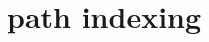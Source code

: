 \documentclass[ 
xcolor={usenames,dvipsnames,svgnames,tablem} 
,handout
]{beamer}
\begin{document}

\begin{frame}
\begin{definition}

\end{definition}
\end{frame}


%
%
%
\section{path indexing}
\end{document}
